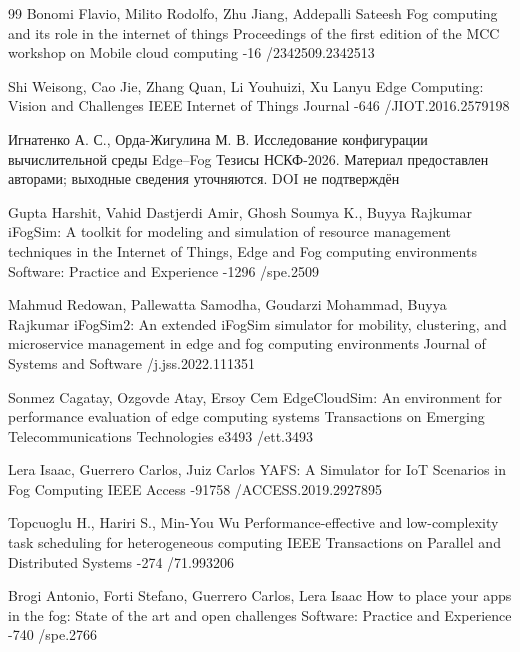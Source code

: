 \begin{thebibliography}{99}
\by Bonomi Flavio, Milito Rodolfo, Zhu Jiang, Addepalli Sateesh
\paper Fog computing and its role in the internet of things
\jour Proceedings of the first edition of the MCC workshop on Mobile cloud computing
-16
/2342509.2342513

\by Shi Weisong, Cao Jie, Zhang Quan, Li Youhuizi, Xu Lanyu
\paper Edge Computing: Vision and Challenges
\jour IEEE Internet of Things Journal
-646
/JIOT.2016.2579198

\by Игнатенко А. С., Орда-Жигулина М. В.
\paper Исследование конфигурации вычислительной среды Edge--Fog
\inbook Тезисы НСКФ-2026. Материал предоставлен авторами; выходные сведения уточняются. DOI не подтверждён

\by Gupta Harshit, Vahid Dastjerdi Amir, Ghosh Soumya K., Buyya Rajkumar
\paper iFogSim: A toolkit for modeling and simulation of resource management techniques in the Internet of Things, Edge and Fog computing environments
\jour Software: Practice and Experience
-1296
/spe.2509

\by Mahmud Redowan, Pallewatta Samodha, Goudarzi Mohammad, Buyya Rajkumar
\paper iFogSim2: An extended iFogSim simulator for mobility, clustering, and microservice management in edge and fog computing environments
\jour Journal of Systems and Software
/j.jss.2022.111351

\by Sonmez Cagatay, Ozgovde Atay, Ersoy Cem
\paper EdgeCloudSim: An environment for performance evaluation of edge computing systems
\jour Transactions on Emerging Telecommunications Technologies
\pages e3493
/ett.3493

\by Lera Isaac, Guerrero Carlos, Juiz Carlos
\paper YAFS: A Simulator for IoT Scenarios in Fog Computing
\jour IEEE Access
-91758
/ACCESS.2019.2927895

\by Topcuoglu H., Hariri S., Min-You Wu 
\paper Performance-effective and low-complexity task scheduling for heterogeneous computing
\jour IEEE Transactions on Parallel and Distributed Systems
-274
/71.993206

\by Brogi Antonio, Forti Stefano, Guerrero Carlos, Lera Isaac
\paper How to place your apps in the fog: State of the art and open challenges
\jour Software: Practice and Experience
-740
/spe.2766


\end{thebibliography}
